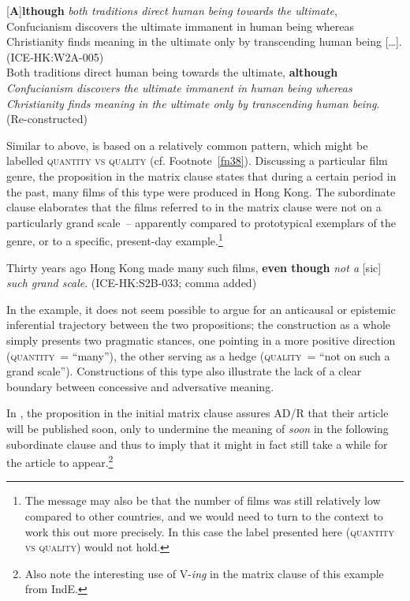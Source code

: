 \eanoraggedright\label{ex:55}
    \ea\label{ex:55a}\label{bkm:Ref487280198}[\textbf{A}]\textbf{lthough} \textit{both traditions direct human being towards the ultimate},  Confucianism discovers the ultimate immanent in human being whereas Christianity finds meaning in the ultimate only by transcending human being […]. (ICE-HK:W2A-005)\\
    \ex\label{ex:55b}Both traditions direct human being towards the ultimate, \textbf{although} \textit{Confucianism discovers the ultimate immanent in human being whereas Christianity finds meaning in the ultimate only by transcending human being}. (Re-constructed)\\
  \z
\z

Similar to  above,  is based on a relatively common pattern, which might be labelled \textsc{quantity vs quality} (cf. Footnote~\ref{fn38}). Discussing a particular film genre, the proposition in the matrix clause states that during a certain period in the past, many films of this type were produced in Hong Kong. The subordinate clause elaborates that the films referred to in the matrix clause were not on a particularly grand scale~– apparently compared to prototypical exemplars of the genre, or to a specific, present-day example.\footnote{The message may also be that the number of films was still relatively low compared to other countries, and we would need to turn to the context to work this out more precisely. In this case the label presented here (\textsc{quantity} \textsc{vs} \textsc{quality}) would not hold.}

\ea\label{ex:56}   \label{bkm:Ref487559663}Thirty years ago Hong Kong made many such films, \textbf{even though} \textit{not a} [sic] \textit{such grand scale}. (ICE-HK:S2B-033; comma added)\\
\z

In the example, it does not seem possible to argue for an anticausal or epistemic inferential trajectory between the two propositions; the construction as a whole simply presents two pragmatic stances, one pointing in a more positive direction (\textsc{quan\-ti\-ty}~= “many”), the other serving as a hedge (\textsc{quality}~= “not on such a grand scale”). Constructions of this type also illustrate the lack of a clear boundary between concessive and adversative meaning.

In , the proposition in the initial matrix clause assures AD/R that their article will be published soon, only to undermine the meaning of \textit{soon} in the following sub\-or\-\-dinate clause and thus to imply that it might in fact still take a while for the article to appear.\footnote{Also note the interesting use of V-\textit{ing} in the matrix clause of this example from IndE.}

